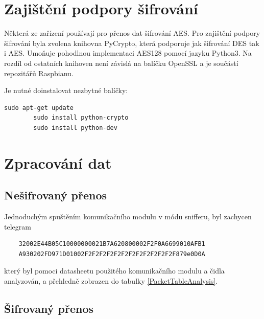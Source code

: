 
\section{Zajištění podpory šifrování}
Některá ze zařízení používají pro přenos dat šifrování AES. Pro zajištění podpory šifrování byla zvolena knihovna PyCrypto, která podporuje jak šifrování DES tak i AES. 
Umoňuje pohodlnou implementaci AES128 pomocí jazyku Python3. Na rozdíl od ostatních knihoven není závislá na balíčku OpenSSL a je součástí repozitářů Raspbianu. 

Je nutné doinstalovat nezbytné balíčky:	
 
\begin{lstlisting}[style=MyCodeBash]
		sudo apt-get update
		sudo install python-crypto
		sudo install python-dev
	\end{lstlisting}


\section{Zpracování dat}

\subsection{Nešifrovaný přenos}

Jednoduchým spuštěním komunikačního modulu v módu snifferu, byl zachycen telegram

\begin{verbatim}
	32002E44B05C10000000021B7A620800002F2F0A6699010AFB1
	A930202FD971D01002F2F2F2F2F2F2F2F2F2F2F2F2F879e0D0A
\end{verbatim}

který byl pomoci datasheetu použitého komunikačního modulu \cite{iqrfmodul} a čidla \cite{WeptechCidlo} analyzován, a přehledně zobrazen do tabulky \ref{PacketTableAnalysis}.

\subsection{Šifrovaný přenos}

